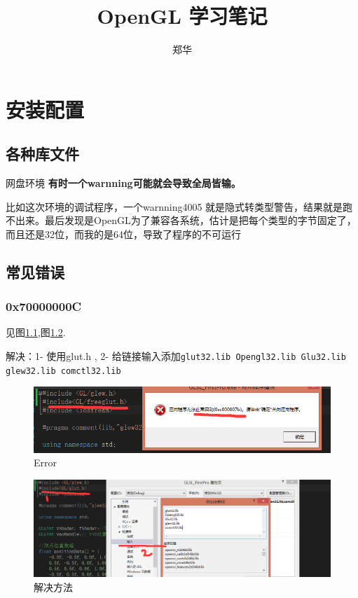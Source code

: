 \documentclass[UTF8,a4paper,12pt]{ctexbook}
\author{\kaishu 郑华}
\title{\heiti OpenGL 学习笔记}
\begin{document}
 	\maketitle
 
	\newpage
	\tableofcontents
	
\newpage
\chapter{安装配置}
    \section{各种库文件}网盘环境
    \textbf{有时一个warnning可能就会导致全局皆输。}
    
    比如这次环境的调试程序，一个warnning4005  就是隐式转类型警告，结果就是跑不出来。最后发现是OpenGL为了兼容各系统，估计是把每个类型的字节固定了，而且还是32位，而我的是64位，导致了程序的不可运行
    
    \section{常见错误}
	    \subsection{0x70000000C}见图\ref{Glut Error},图\ref{Glut_fix}.
	    
		    解决：1- 使用glut.h , 2- 给链接输入添加\verb|glut32.lib Opengl32.lib Glu32.lib glew32.lib comctl32.lib|
		    \begin{figure}[h]
		    	\begin{center}
					\includegraphics[scale = 0.5]{glutDoesNotMatchError.png}%
		    		\caption{Error}
		    		\label{Glut Error}
		    	\end{center}
		    \end{figure}
		    \begin{figure}[h]
		    	\centering
		    	\includegraphics[scale = 0.4]{glutMatch.png}
		    	\caption{解决方法}
		    	\label{Glut_fix}
		    \end{figure}
		    
\end{document}
